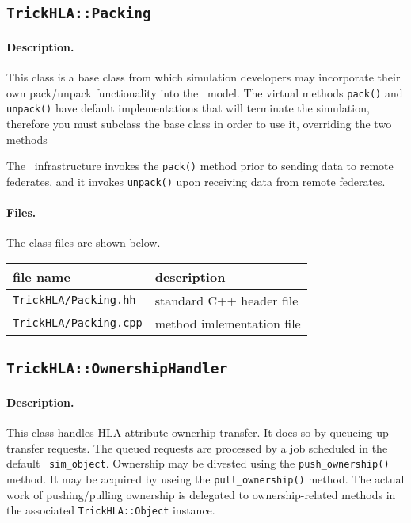 \subsection{{\tt TrickHLA::Packing}}

\paragraph{Description.}
This class is a base class from which simulation developers may
incorporate their own pack/unpack functionality into the \TrickHLA\ model.
The virtual methods {\tt pack()} and {\tt unpack()} have default implementations
that will terminate the simulation, therefore you must subclass the base class
in order to use it, overriding the two methods

The \TrickHLA\ infrastructure invokes the {\tt pack()} method prior to
sending data to remote federates, and it invokes {\tt unpack()} upon receiving
data from remote federates.

\paragraph{Files.}
The class files are shown below.
   
{
  \scriptsize
  \begin{tabular}{|l|l|} 
    \hline
    file name & description \\
    \hline \hline
    {\tt TrickHLA/Packing.hh} 
    & standard C++ header file
    \\ \hline
    {\tt TrickHLA/Packing.cpp} 
    & method imlementation file
    \\ \hline
  \end{tabular}
}

\subsection{{\tt TrickHLA::OwnershipHandler}}

\paragraph{Description.}
This class handles HLA attribute ownerhip transfer.
It does so by queueing up transfer requests.  
The queued requests are processed by a job scheduled in the
default \TrickHLA\ {\tt sim\_object}.
Ownership may be divested using the {\tt push\_ownership()} method.
It may be acquired by useing the {\tt pull\_ownership()} method.
The actual work of pushing/pulling ownership is delegated to
ownership-related methods in the associated {\tt TrickHLA::Object} instance.

